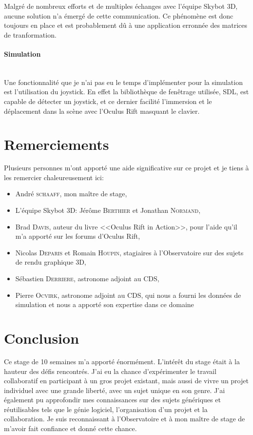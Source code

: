 \documentclass[a4paper,french,12pt]{article}
\begin{document}
	Malgré de nombreux efforts et de multiples échanges avec l'équipe Skybot 3D, aucune solution n'a émergé de
	cette communication. Ce phénomène est donc toujours en place et est probablement dû à une application erronnée
	des matrices de tranformation.

      \paragraph{Simulation}~\\
	Une fonctionnalité que je n'ai pas eu le temps d'implémenter pour la simulation est l'utilisation du joystick.
	En effet la bibliothèque de fenêtrage utilisée, SDL, est capable de détecter un joystick, et ce dernier
	facilité l'immersion et le déplacement dans la scène avec l'Oculus Rift masquant le clavier.



\section{Remerciements}

	Plusieurs personnes m’ont apporté une aide significative sur ce projet et je tiens à les remercier chaleureusement ici:

	\begin{itemize}
	\item André \textsc{schaaff}, mon maître de stage,
	\item L'équipe Skybot 3D: Jérôme \textsc{Berthier} et Jonathan \textsc{Normand},
	\item Brad \textsc{Davis}, auteur du livre <<Oculus Rift in Action>>, pour l'aide qu'il m'a apporté sur les forums d'Oculus Rift,
	\item Nicolas \textsc{Deparis} et Romain \textsc{Houpin}, stagiaires à l'Observatoire sur des sujets de rendu graphique 3D,
	\item Sébastien \textsc{Derriere}, astronome adjoint au CDS,
	\item Pierre \textsc{Ocvirk}, astronome adjoint au CDS, qui nous a fourni les données de simulation et nous a apporté son expertise dans ce domaine
	\end{itemize}

\section{Conclusion}


	Ce stage de 10 semaines m'a apporté énormément. L'intérêt du stage était à la hauteur des défis rencontrés.
	J'ai eu la chance d'expérimenter le travail collaboratif en participant à un gros projet existant, mais aussi
	de vivre un projet individuel avec une grande liberté, avec un sujet unique en son genre.
	J'ai également pu approfondir mes connaissances sur des sujets génériques et réutilisables tels que le génie logiciel,
	l'organisation d'un projet et la collaboration.
	Je suis reconnaissant à l'Observatoire et à mon maître de stage de m'avoir fait confiance et donné cette chance.
\end{document}
